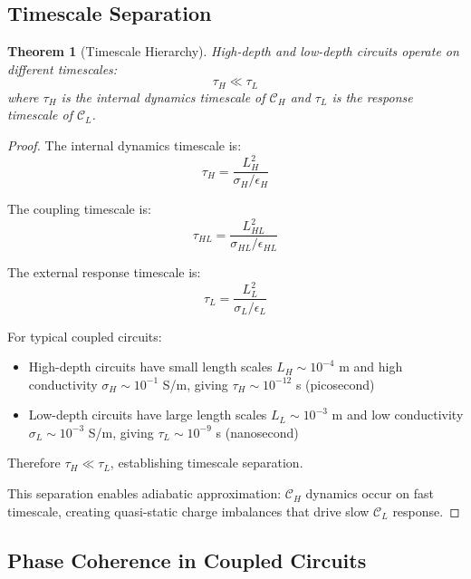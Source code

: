 \documentclass[12pt,a4paper]{article}
\theoremstyle{plain}
\newtheorem{theorem}{Theorem}[section]
\theoremstyle{definition}
\theoremstyle{remark}
\begin{document}
\subsection{Timescale Separation}

\begin{theorem}[Timescale Hierarchy]
\label{thm:timescale_hierarchy}
High-depth and low-depth circuits operate on different timescales:
\begin{equation}
\tau_H \ll \tau_L
\end{equation}
where $\tau_H$ is the internal dynamics timescale of $\mathcal{C}_H$ and $\tau_L$ is the response timescale of $\mathcal{C}_L$.
\end{theorem}

\begin{proof}
The internal dynamics timescale is:
\begin{equation}
\tau_H = \frac{L_H^2}{\sigma_H / \epsilon_H}
\end{equation}

The coupling timescale is:
\begin{equation}
\tau_{HL} = \frac{L_{HL}^2}{\sigma_{HL} / \epsilon_{HL}}
\end{equation}

The external response timescale is:
\begin{equation}
\tau_L = \frac{L_L^2}{\sigma_L / \epsilon_L}
\end{equation}

For typical coupled circuits:
\begin{itemize}
\item High-depth circuits have small length scales $L_H \sim 10^{-4}$ m and high conductivity $\sigma_H \sim 10^{-1}$ S/m, giving $\tau_H \sim 10^{-12}$ s (picosecond)
\item Low-depth circuits have large length scales $L_L \sim 10^{-3}$ m and low conductivity $\sigma_L \sim 10^{-3}$ S/m, giving $\tau_L \sim 10^{-9}$ s (nanosecond)
\end{itemize}

Therefore $\tau_H \ll \tau_L$, establishing timescale separation.

This separation enables adiabatic approximation: $\mathcal{C}_H$ dynamics occur on fast timescale, creating quasi-static charge imbalances that drive slow $\mathcal{C}_L$ response.
\end{proof}

\subsection{Phase Coherence in Coupled Circuits}
\end{document}
